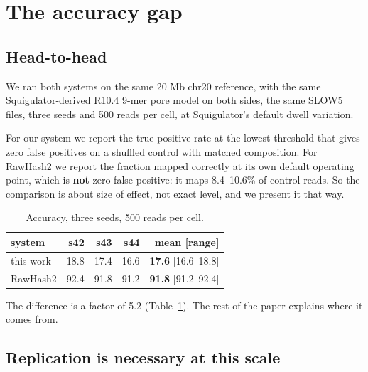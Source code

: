 \documentclass[conference]{IEEEtran}
\begin{document}
\section{The accuracy gap}
\label{sec:gap}

\subsection{Head-to-head}

We ran both systems on the same 20 Mb chr20 reference, with the same Squigulator-derived R10.4
9-mer pore model on both sides, the same SLOW5 files, three seeds and 500 reads per cell, at
Squigulator's default dwell variation.

For our system we report the true-positive rate at the lowest threshold that gives zero false
positives on a shuffled control with matched composition. For RawHash2 we report the fraction
mapped correctly at its own default operating point, which is \textbf{not} zero-false-positive:
it maps 8.4--10.6\% of control reads. So the comparison is about size of effect, not exact
level, and we present it that way.

\begin{table}[t]
\caption{Accuracy, three seeds, 500 reads per cell.}
\label{tab:acc}
\centering
\footnotesize
\begin{tabular}{lrrrr}
\toprule
system & s42 & s43 & s44 & mean [range] \\
\midrule
this work  & 18.8 & 17.4 & 16.6 & \textbf{17.6} [16.6--18.8] \\
RawHash2   & 92.4 & 91.8 & 91.2 & \textbf{91.8} [91.2--92.4] \\
\bottomrule
\end{tabular}
\end{table}

The difference is a factor of 5.2 (Table~\ref{tab:acc}). The rest of the paper explains where it
comes from.

\subsection{Replication is necessary at this scale}
\end{document}
